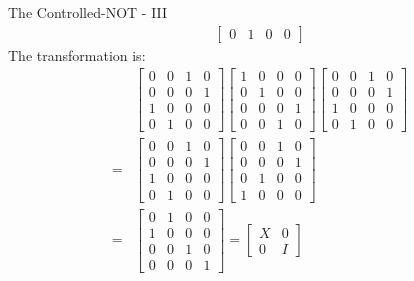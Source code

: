\documentclass{beamer}
\begin{document}
\begin{frame}{The Controlled-NOT - III}
{\begin{align*}
\begin{bmatrix}
        0 & 1 & 0 & 0
       \end{bmatrix}
    \end{align*}
    The transformation is:
    \begin{align*}
        &\begin{bmatrix}
        0 & 0 & 1 & 0 \\
        0 & 0 & 0 & 1 \\
        1 & 0 & 0 & 0 \\
        0 & 1 & 0 & 0
        \end{bmatrix}
        \begin{bmatrix}
        1 & 0 & 0 & 0 \\
        0 & 1 & 0 & 0 \\
        0 & 0 & 0 & 1 \\
        0 & 0 & 1 & 0
        \end{bmatrix}
        \begin{bmatrix}
        0 & 0 & 1 & 0 \\
        0 & 0 & 0 & 1 \\
        1 & 0 & 0 & 0 \\
        0 & 1 & 0 & 0
        \end{bmatrix} \\
        = &
        \begin{bmatrix}
        0 & 0 & 1 & 0 \\
        0 & 0 & 0 & 1 \\
        1 & 0 & 0 & 0 \\
        0 & 1 & 0 & 0
        \end{bmatrix}
        \begin{bmatrix}
        0 & 0 & 1 & 0 \\
        0 & 0 & 0 & 1 \\
        0 & 1 & 0 & 0 \\
        1 & 0 & 0 & 0
        \end{bmatrix} \\
        = &
        \begin{bmatrix}
        0 & 1 & 0 & 0 \\
        1 & 0 & 0 & 0 \\
        0 & 0 & 1 & 0 \\
        0 & 0 & 0 & 1
        \end{bmatrix}
        = \begin{bmatrix} X & 0 \\ 0 & I \end{bmatrix}
    \end{align*}
  }%
\end{frame}
\end{document}
